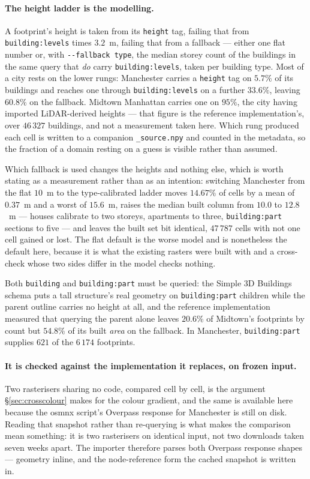 \documentclass[11pt,a4paper]{article}
\newcommand{\code}[1]{\texttt{\small #1}}
\begin{document}
\paragraph{The height ladder is the modelling.} A footprint's height is taken
from its \code{height} tag, failing that from \code{building:levels} times
$3.2$~m, failing that from a fallback --- either one flat number or, with
\code{-{}-fallback type}, the median storey count of the buildings in the same
query that \emph{do} carry \code{building:levels}, taken per building type.
Most of a city rests on the lower rungs: Manchester carries a \code{height} tag
on $5.7\%$ of its buildings and reaches one through \code{building:levels} on a
further $33.6\%$, leaving $60.8\%$ on the fallback. Midtown Manhattan carries
one on $95\%$, the city having imported LiDAR-derived heights --- that figure
is the reference implementation's, over $46\,327$ buildings, and not a
measurement taken here. Which rung produced each cell is written to a
companion \code{\_source.npy} and counted in the metadata, so the fraction of a
domain resting on a guess is visible rather than assumed.

Which fallback is used changes the heights and nothing else, which is worth
stating as a measurement rather than as an intention: switching Manchester from
the flat $10$~m to the type-calibrated ladder moves $14.67\%$ of cells by a
mean of $0.37$~m and a worst of $15.6$~m, raises the median built column from
$10.0$ to $12.8$~m --- houses calibrate to two storeys, apartments to three,
\code{building:part} sections to five --- and leaves the built set bit
identical, $47\,787$ cells with not one cell gained or lost. The flat default
is the worse model and is nonetheless the default here, because it is what the
existing rasters were built with and a cross-check whose two sides differ in
the model checks nothing.

Both \code{building}
and \code{building:part} must be queried: the Simple 3D Buildings schema puts a
tall structure's real geometry on \code{building:part} children while the
parent outline carries no height at all, and the reference implementation measured that querying the
parent alone leaves $20.6\%$ of Midtown's footprints by count but $54.8\%$ of
its built \emph{area} on the fallback. In Manchester, \code{building:part}
supplies $621$ of the $6\,174$ footprints.

\paragraph{It is checked against the implementation it replaces, on frozen
input.} Two rasterisers sharing no code, compared cell by cell, is the argument
\S\ref{sec:crosscolour} makes for the colour gradient, and the same is
available here because the osmnx script's Overpass response for Manchester is
still on disk. Reading that snapshot rather than re-querying is what makes the
comparison mean something: it is two rasterisers on identical input, not two
downloads taken seven weeks apart. The importer therefore parses both Overpass
response shapes --- geometry inline, and the node-reference form the cached
snapshot is written in.
\end{document}
